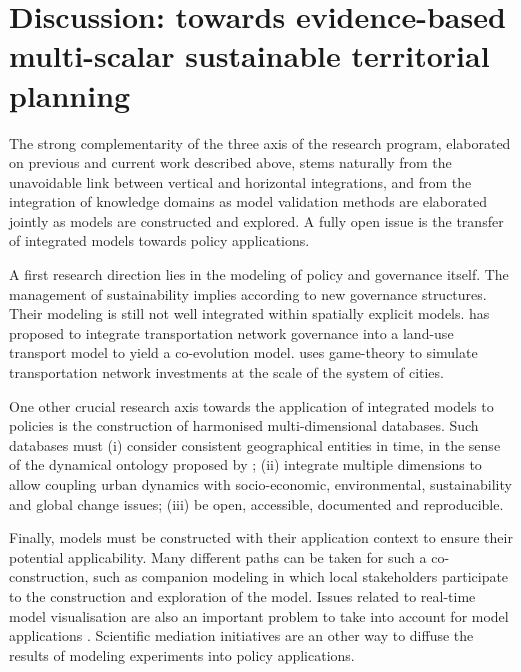\section{Discussion: towards evidence-based multi-scalar sustainable territorial planning}

The strong complementarity of the three axis of the research program, elaborated on previous and current work described above, stems naturally from the unavoidable link between vertical and horizontal integrations, and from the integration of knowledge domains as model validation methods are elaborated jointly as models are constructed and explored. A fully open issue is the transfer of integrated models towards policy applications.


A first research direction lies in the modeling of policy and governance itself. The management of sustainability implies according to \cite{etzion2018management} new governance structures. Their modeling is still not well integrated within spatially explicit models. \cite{le2015modeling} has proposed to integrate transportation network governance into a land-use transport model to yield a co-evolution model. \cite{raimbault2020coevolution} uses game-theory to simulate transportation network investments at the scale of the system of cities.


One other crucial research axis towards the application of integrated models to policies is the construction of harmonised multi-dimensional databases. Such databases must (i) consider consistent geographical entities in time, in the sense of the dynamical ontology proposed by \cite{bretagnolle2009villes}; (ii) integrate multiple dimensions to allow coupling urban dynamics with socio-economic, environmental, sustainability and global change issues; (iii) be open, accessible, documented and reproducible.

Finally, models must be constructed with their application context to ensure their potential applicability. Many different paths can be taken for such a co-construction, such as companion modeling \cite{drogoul2015agent} in which local stakeholders participate to the construction and exploration of the model. Issues related to real-time model visualisation are also an important problem to take into account for model applications \cite{milton2019accelerating}. Scientific mediation initiatives are an other way to diffuse the results of modeling experiments into policy applications.

\vspace{-0.5cm}


